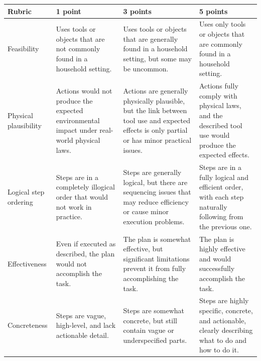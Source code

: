 \begin{center}
\parbox{0.95\linewidth}{
\label{fig:case-study-2-env-3}
}
\end{center}











\begin{table}[htbp]
\centering
\small
\setlength{\tabcolsep}{4pt}
\renewcommand{\arraystretch}{1.25}
\begin{tabular}{p{2.5cm} p{3.5cm} p{3.5cm} p{3.5cm}}
\hline
\textbf{Rubric} & \textbf{1 point} & \textbf{3 points} & \textbf{5 points} \\
\hline
Feasibility &
Uses tools or objects that are not commonly found in a household setting. &
Uses tools or objects that are generally found in a household setting, but some may be uncommon. &
Uses only tools or objects that are commonly found in a household setting. \\
\hline
Physical plausibility &
Actions would not produce the expected environmental impact under real-world physical laws. &
Actions are generally physically plausible, but the link between tool use and expected effects is only partial or has minor practical issues. &
Actions fully comply with physical laws, and the described tool use would produce the expected effects. \\
\hline
Logical step ordering &
Steps are in a completely illogical order that would not work in practice. &
Steps are generally logical, but there are sequencing issues that may reduce efficiency or cause minor execution problems. &
Steps are in a fully logical and efficient order, with each step naturally following from the previous one. \\
\hline
Effectiveness &
Even if executed as described, the plan would not accomplish the task. &
The plan is somewhat effective, but significant limitations prevent it from fully accomplishing the task. &
The plan is highly effective and would successfully accomplish the task. \\
\hline
Concreteness &
Steps are vague, high-level, and lack actionable detail. &
Steps are somewhat concrete, but still contain vague or underspecified parts. &
Steps are highly specific, concrete, and actionable, clearly describing what to do and how to do it. \\

\end{tabular}
\end{table}

